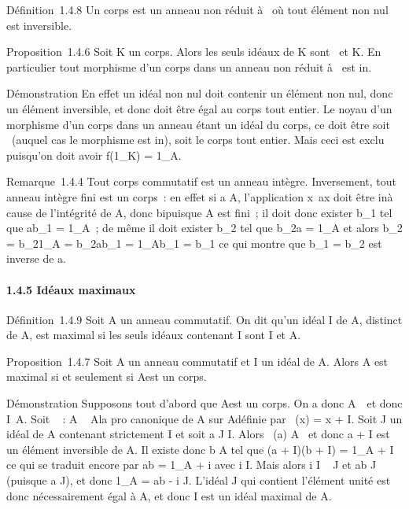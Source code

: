 \documentclass[]{article}
\begin{document}
Définition~1.4.8 Un corps est un anneau non réduit à
\0\ où tout élément non nul est
inversible.

Proposition~1.4.6 Soit K un corps. Alors les seuls idéaux de K sont
\0\ et K. En particulier tout
morphisme d'un corps dans un anneau non réduit à
\0\ est in\jmathectif.

Démonstration En effet un idéal non nul doit contenir un élément non
nul, donc un élément inversible, et donc doit être égal au corps tout
entier. Le noyau d'un morphisme d'un corps dans un anneau étant un idéal
du corps, ce doit être soit \0\
(auquel cas le morphisme est in\jmathectif), soit le corps tout entier. Mais
ceci est exclu puisqu'on doit avoir f(1\_K) = 1\_A.

Remarque~1.4.4 Tout corps commutatif est un anneau intègre. Inversement,
tout anneau intègre fini est un corps~: en effet si a \in A, l'application
x\mapsto~ax doit être in\jmathective à cause de
l'intégrité de A, donc bi\jmathective puisque A est fini~; il doit donc
exister b\_1 tel que ab\_1 = 1\_A~; de même il
doit exister b\_2 tel que b\_2a = 1\_A et alors
b\_2 = b\_21\_A = b\_2ab\_1 =
1\_Ab\_1 = b\_1 ce qui montre que b\_1 =
b\_2 est inverse de a.

\paragraph{1.4.5 Idéaux maximaux}

Définition~1.4.9 Soit A un anneau commutatif. On dit qu'un idéal I de A,
distinct de A, est maximal si les seuls idéaux contenant I sont I et A.

Proposition~1.4.7 Soit A un anneau commutatif et I un idéal de A. Alors
A est maximal si et seulement si A\diagupI est un corps.

Démonstration Supposons tout d'abord que A\diagupI est un corps. On a donc
A\diagupI\neq~\0\ et
donc I\neq~A. Soit \pi~ : A \rightarrow~ A\diagupI la pro\jmathection
canonique de A sur A\diagupI définie par \pi~(x) = x + I. Soit J un idéal de A
contenant strictement I et soit a \in J \diagdown I. Alors \pi~(a) \in A\diagupI
\diagdown\0\ et donc a + I est un élément
inversible de A\diagupI. Il existe donc b \in A tel que (a + I)(b + I) =
1\_A + I ce qui se traduit encore par ab = 1\_A + i avec
i \in I. Mais alors i \in I \subset~ J et ab \in J (puisque a \in J), et donc
1\_A = ab - i \in J. L'idéal J qui contient l'élément unité est
donc nécessairement égal à A, et donc I est un idéal maximal de A.
\end{document}
